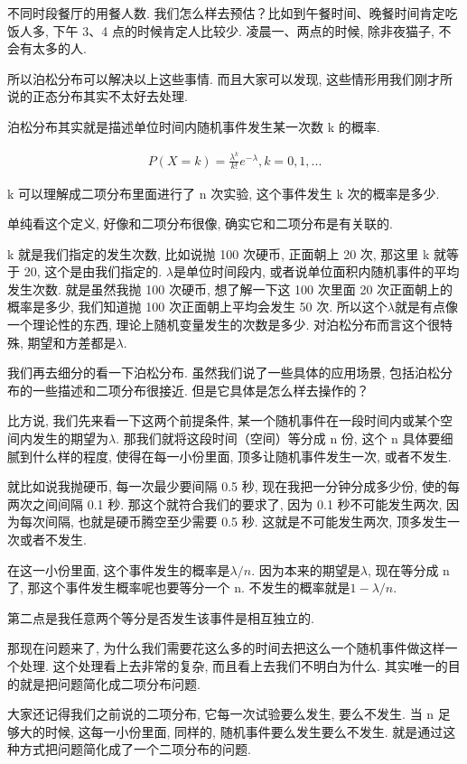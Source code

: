 不同时段餐厅的用餐人数. 我们怎么样去预估？比如到午餐时间、晚餐时间肯定吃饭人多, 下午 3、4 点的时候肯定人比较少. 凌晨一、两点的时候, 除非夜猫子, 不会有太多的人. 

所以泊松分布可以解决以上这些事情. 而且大家可以发现, 这些情形用我们刚才所说的正态分布其实不太好去处理. 

泊松分布其实就是描述单位时间内随机事件发生某一次数 k 的概率. 

\begin{align*}
  P(X=k) = \frac{\lambda^k}{k!}e^{-\lambda},k=0,1,...
\end{align*}

k 可以理解成二项分布里面进行了 n 次实验, 这个事件发生 k 次的概率是多少. 

单纯看这个定义, 好像和二项分布很像, 确实它和二项分布是有关联的. 

k 就是我们指定的发生次数, 比如说抛 100 次硬币, 正面朝上 20 次, 那这里 k 就等于 20, 这个是由我们指定的. $\lambda$是单位时间段内, 或者说单位面积内随机事件的平均发生次数. 就是虽然我抛 100 次硬币, 想了解一下这 100 次里面 20 次正面朝上的概率是多少, 我们知道抛 100 次正面朝上平均会发生 50 次. 所以这个$\lambda$就是有点像一个理论性的东西, 理论上随机变量发生的次数是多少. 对泊松分布而言这个很特殊, 期望和方差都是$\lambda$. 

我们再去细分的看一下泊松分布. 虽然我们说了一些具体的应用场景, 包括泊松分布的一些描述和二项分布很接近. 但是它具体是怎么样去操作的？

比方说, 我们先来看一下这两个前提条件, 某一个随机事件在一段时间内或某个空间内发生的期望为$\lambda$. 那我们就将这段时间（空间）等分成 n 份, 这个 n 具体要细腻到什么样的程度, 使得在每一小份里面, 顶多让随机事件发生一次, 或者不发生. 

就比如说我抛硬币, 每一次最少要间隔 0.5 秒, 现在我把一分钟分成多少份, 使的每两次之间间隔 0.1 秒. 那这个就符合我们的要求了, 因为 0.1 秒不可能发生两次, 因为每次间隔, 也就是硬币腾空至少需要 0.5 秒. 这就是不可能发生两次, 顶多发生一次或者不发生. 

在这一小份里面, 这个事件发生的概率是$\lambda /n$. 因为本来的期望是$\lambda$, 现在等分成 n 了, 那这个事件发生概率呢也要等分一个 n. 不发生的概率就是$1-\lambda /n$. 

第二点是我任意两个等分是否发生该事件是相互独立的. 

那现在问题来了, 为什么我们需要花这么多的时间去把这么一个随机事件做这样一个处理. 这个处理看上去非常的复杂, 而且看上去我们不明白为什么. 其实唯一的目的就是把问题简化成二项分布问题. 

大家还记得我们之前说的二项分布, 它每一次试验要么发生, 要么不发生. 当 n 足够大的时候, 这每一小份里面, 同样的, 随机事件要么发生要么不发生. 就是通过这种方式把问题简化成了一个二项分布的问题. 

